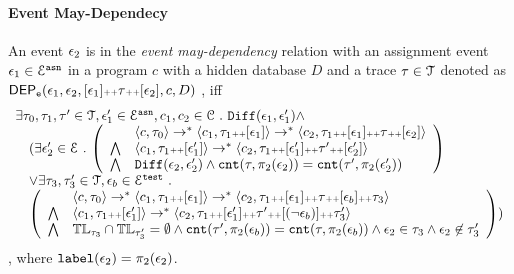 \paragraph*{Event May-Dependecy}
\begin{defn}
\label{def:event_dep}
 An event $\mathtt{\epsilon}_2$ is in the \emph{event may-dependency} relation with an assignment
 event $\mathtt{\epsilon}_1 \in \mathcal{E}^{\mathtt{{asn}}}$ in a program ${c}$
 with a hidden database $D$ and a trace $\mathtt{\tau} \in \mathcal{T}$ denoted as 
 $\mathsf{DEP_{\mathtt{e}}}(\mathtt{\epsilon}_1, \mathtt{\epsilon}_2, [\mathtt{\epsilon}_1 ] {\scriptscriptstyle ++} \mathtt{\tau} {\scriptscriptstyle ++} [\mathtt{\epsilon}_2], c, D)$
 , iff
 \[
 \begin{array}{l}
 \exists \vtrace_0,
 \vtrace_1, \vtrace' \in \mathcal{T},\event_1' \in \eventset^{\asn}, {c}_1, {c}_2 \in \cdom \st
 \diff(\event_1, \event_1') \land 
 \\ \quad
 (
 \exists \event_2' \in \eventset \st 
 \left(
 \begin{array}{ll} 
 & \config{{c}, \vtrace_0} \rightarrow^{*} 
 \config{{c}_1, \vtrace_1 \tracecat [\event_1]} \rightarrow^{*} 
 \config{{c}_2, \vtrace_1 \tracecat [\event_1] \tracecat \vtrace \tracecat [\event_2] } 
 \\ 
 \bigwedge &
 \config{{c}_1, \vtrace_1 \tracecat [\event_1']} \rightarrow^{*} 
 \config{{c}_2, \vtrace_1 \tracecat[ \event_1'] \tracecat \vtrace' \tracecat [\event_2'] } 
 \\
 \bigwedge & 
 \diff(\event_2,\event_2' ) \land 
 \vcounter(\vtrace, \pi_2(\event_2))
 = 
 \vcounter(\vtrace', \pi_2(\event_2'))\\
 \end{array}
 \right)
 \\ \quad
 \lor 
 \exists \vtrace_3, \vtrace_3' \in \mathcal{T}, \event_b \in \eventset^{\test} \st 
 \\ \quad
 \left(
 \begin{array}{ll} 
 & \config{{c}, \vtrace_0} \rightarrow^{*} 
 \config{{c}_1, \vtrace_1 \tracecat [\event_1]} \rightarrow^{*} 
 \config{c_2, \vtrace_1 \tracecat [\event_1] \tracecat \trace \tracecat [\event_b] \tracecat \trace_3} 
 \\ 
 \bigwedge &
 \config{{c}_1, \vtrace_1 \tracecat [\event_1']} \rightarrow^{*} 
 \config{c_2, \vtrace_1 \tracecat [\event_1'] \tracecat \trace' \tracecat [(\neg \event_b)] \tracecat \trace_3'} 
 \\
 \bigwedge & \tlabel_{\trace_3} \cap \tlabel_{\trace_3'} = \emptyset
 \land \vcounter(\trace', \pi_2(\event_b)) = \vcounter(\trace, \pi_2(\event_b)) 
 \land \event_2 \in \trace_3
 \land \event_2 \not\in \trace_3'
 \end{array}
 \right)
 )
\end{array}
 \]
, where ${\tt label}(\mathtt{\epsilon}_2) = \pi_2(\mathtt{\epsilon}_2)$.
\end{defn}
